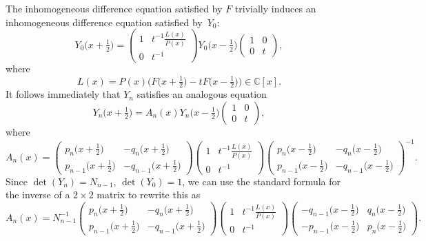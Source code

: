\documentclass[10pt,a4paper]{amsart}
\newcommand{\CN}{\mathbb{C}} %
\theoremstyle{definition}
\numberwithin{equation}{section}
\begin{document}
The inhomogeneous difference equation satisfied by $F$ trivially induces an
inhomogeneous difference equation satisfied by~$Y_0$:
\[
Y_0\big(x+\tfrac{1}{2}\big)
=
\begin{pmatrix}
 1 & t^{-1}\frac{L(x)}{P(x)}\\[1ex]
 0 & t^{-1}
\end{pmatrix}
Y_0\big(x-\tfrac{1}{2}\big)
\begin{pmatrix}
 1 & 0\\
 0 & t
\end{pmatrix} ,
\]
where
\[
L(x) = P(x)\big(F\big(x+\tfrac{1}{2}\big)-tF\big(x-\tfrac{1}{2}\big)\big)\in \CN[x].
\]
It follows immediately that $Y_n$ satisfies an analogous equation
\[
Y_n\big(x+\tfrac{1}{2}\big)=A_n(x)Y_n\big(x-\tfrac{1}{2}\big)
\begin{pmatrix}
 1 & 0\\
 0 & t
\end{pmatrix} ,
\]
where
\[
A_n(x)=
\begin{pmatrix} p_n\big(x+\frac{1}{2}\big) & -q_n\big(x+\frac{1}{2}\big)\\[1ex]
 p_{n-1}\big(x+\frac{1}{2}\big) & -q_{n-1}\big(x+\frac{1}{2}\big)\end{pmatrix}
\begin{pmatrix}
 1 & t^{-1}\frac{L(x)}{P(x)}\\[1ex]
 0 & t^{-1}
\end{pmatrix}
\begin{pmatrix} p_n\big(x-\tfrac{1}{2}\big) & -q_n\big(x-\tfrac{1}{2}\big)\\[1ex]
 p_{n-1}\big(x-\tfrac{1}{2}\big) & -q_{n-1}\big(x-\tfrac{1}{2}\big)\end{pmatrix}^{-1}.
\]
Since $\det(Y_n)=N_{n-1}$, $\det(Y_0)=1$, we can use the standard formula
for the inverse of a $2\times 2$ matrix to rewrite this as
\[
A_n(x)
=
N_{n-1}^{-1}
\begin{pmatrix} p_n\big(x+\frac{1}{2}\big) & -q_n\big(x+\frac{1}{2}\big)\\[1ex]
 p_{n-1}\big(x+\frac{1}{2}\big) & -q_{n-1}\big(x+\frac{1}{2}\big)\end{pmatrix}
\begin{pmatrix}
 1 & t^{-1}\frac{L(x)}{P(x)}\\[1ex]
 0 & t^{-1}
\end{pmatrix}
\begin{pmatrix} -q_{n-1}\big(x-\tfrac{1}{2}\big) & q_n\big(x-\tfrac{1}{2}\big)\\[1ex]
 -p_{n-1}\big(x-\tfrac{1}{2}\big) & p_n\big(x-\tfrac{1}{2}\big)\end{pmatrix} .
\]
\end{document}
